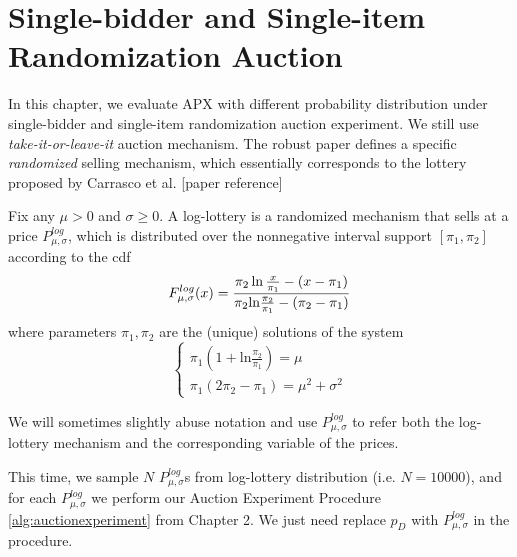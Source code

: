 \chapter{Single-bidder and Single-item Randomization Auction}
\label{ch:body of thesis}
In this chapter, we evaluate APX with different probability distribution under single-bidder and single-item randomization auction experiment. We still use \textit{take-it-or-leave-it} auction mechanism. The robust paper defines a specific \textit{randomized} selling mechanism, which essentially corresponds to the lottery proposed by Carrasco et al. [paper reference]
\begin{definition}
	\label{definition:loglottery}
	Fix any $\mu > 0$ and $\sigma \geqslant 0$. A log-lottery is a randomized mechanism that sells at a price $P^{log}_{\mu,\sigma}$, which is distributed over the nonnegative interval support $[\pi_1, \pi_2]$ according to the cdf
	\begin{equation}\notag
		F^{log}_{\mu,\sigma} (x) =  \frac{\pi_2 \ln\frac{x}{\pi_1} -(x - \pi_1)}{\pi_2 \text{ln} \frac{\pi_2}{\pi_1} - (\pi_2-\pi_1)}
	\end{equation}
	where parameters $\pi_1,\pi_2$ are the (unique) solutions of the system
	\begin{equation}
		\begin{cases} \pi_1 (1 + \text{ln}\frac{\pi_2}{\pi_1}) = \mu   \\    \pi_1(2\pi_2 - \pi_1) = \mu^2 + \sigma^2  \end{cases}
	\end{equation}
\end{definition}
We will sometimes slightly abuse notation and use $P^{log}_{\mu,\sigma}$ to refer both the log-lottery mechanism and the corresponding variable of the prices.

This time, we sample $N$ $P^{log}_{\mu,\sigma}$s from log-lottery distribution (i.e. $N = 10000$), and for each $P^{log}_{\mu,\sigma}$ we perform our Auction Experiment Procedure \ref{alg:auctionexperiment} from Chapter 2. We just need replace $p_D$ with $P^{log}_{\mu,\sigma}$ in the procedure. 
